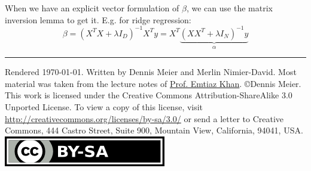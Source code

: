 \documentclass[10pt,a4paper,landscape]{article}
\begin{document}
\begin{multicols*}{4}
When we have an explicit vector formulation of $\beta$, we can use the matrix inversion lemma to get it. E.g. for ridge regression:
$$\beta = (X^T X  + \lambda I_D)^{-1} X^T y = X^T \underbrace{(X X^T + \lambda I_N)^{-1} y}_{\alpha}$$




\hrule
\tiny
Rendered \today. Written by Dennis Meier and Merlin Nimier-David. Most material was taken from the lecture notes of \href{http://people.epfl.ch/228491}{Prof. Emtiaz Khan}.
\copyright Dennis Meier. This work is licensed under the Creative Commons Attribution-ShareAlike 3.0 Unported License.
To view a copy of this license, visit \href{http://creativecommons.org/licenses/by-sa/3.0/}{http://creativecommons.org/licenses/by-sa/3.0/} or
send a letter to Creative Commons, 444 Castro Street, Suite 900, Mountain View, California, 94041, USA.
\includegraphics{images/by-sa.png}

\end{multicols*}
\end{document}
